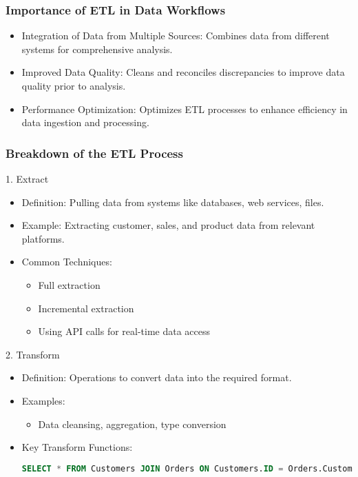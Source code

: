 \documentclass[aspectratio=169]{beamer}
\begin{document}
\begin{frame}[fragile]
    \frametitle{Importance of ETL in Data Workflows}
    \begin{itemize}
        \item Integration of Data from Multiple Sources: Combines data from different systems for comprehensive analysis.
        \item Improved Data Quality: Cleans and reconciles discrepancies to improve data quality prior to analysis.
        \item Performance Optimization: Optimizes ETL processes to enhance efficiency in data ingestion and processing.
    \end{itemize}
\end{frame}

\begin{frame}[fragile]
    \frametitle{Breakdown of the ETL Process}
    \begin{block}{1. Extract}
        \begin{itemize}
            \item Definition: Pulling data from systems like databases, web services, files.
            \item Example: Extracting customer, sales, and product data from relevant platforms.
            \item Common Techniques:
                \begin{itemize}
                    \item Full extraction
                    \item Incremental extraction
                    \item Using API calls for real-time data access
                \end{itemize}
        \end{itemize}
    \end{block}
    
    \begin{block}{2. Transform}
        \begin{itemize}
            \item Definition: Operations to convert data into the required format.
            \item Examples:
                \begin{itemize}
                    \item Data cleansing, aggregation, type conversion
                \end{itemize}
            \item Key Transform Functions:
                \begin{lstlisting}[language=SQL]
SELECT * FROM Customers JOIN Orders ON Customers.ID = Orders.CustomerID;
                \end{lstlisting}
        \end{itemize}
    \end{block}
\end{frame}
\end{document}
